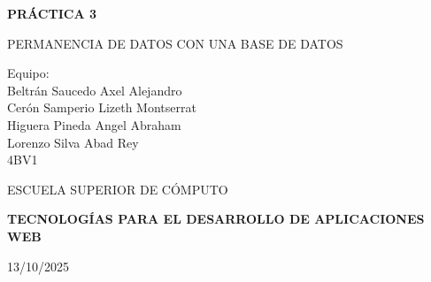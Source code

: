 \documentclass[12pt]{article}
\begin{document}

\begin{titlepage}
    \thispagestyle{empty}
    
    
    \begin{spacing}{1.5}
        {\Huge \bfseries \noindent PRÁCTICA 3}
        \vspace{10pt}

        {\LARGE PERMANENCIA DE DATOS CON UNA BASE DE DATOS}
        
        \vspace{1cm}
        
        {\Large Equipo:} \\
        {\Large Beltrán Saucedo Axel Alejandro} \\
        {\Large Cerón Samperio Lizeth Montserrat} \\
        {\Large Higuera Pineda Angel Abraham} \\
        {\Large Lorenzo Silva Abad Rey} \\
        {\Large 4BV1}
    \end{spacing}
    
    \vspace{1.5cm}

    \begin{minipage}{7.5cm} %
        {\Large ESCUELA SUPERIOR DE CÓMPUTO}
    \end{minipage}

    \vfill %

    \begin{flushleft}
        {\Large \color{black}
        \textbf{TECNOLOGÍAS PARA EL DESARROLLO DE APLICACIONES WEB}}
        
        \vspace{0.5cm}
        
        13/10/2025
    \end{flushleft}
    \vspace{1cm}
\end{titlepage}
\end{document}

